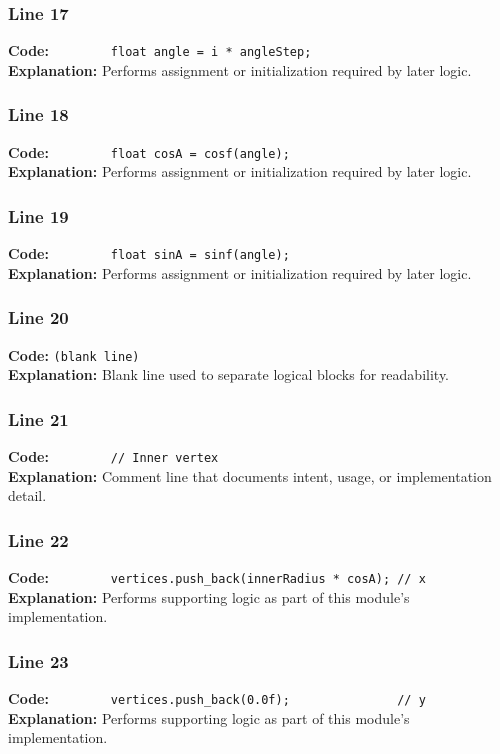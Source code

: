 \documentclass[11pt,a4paper]{article}
\begin{document}
\subsubsection*{Line 17}
\textbf{Code:} \verb|        float angle = i * angleStep;|\\
\textbf{Explanation:} Performs assignment or initialization required by later logic.

\subsubsection*{Line 18}
\textbf{Code:} \verb|        float cosA = cosf(angle);|\\
\textbf{Explanation:} Performs assignment or initialization required by later logic.

\subsubsection*{Line 19}
\textbf{Code:} \verb|        float sinA = sinf(angle);|\\
\textbf{Explanation:} Performs assignment or initialization required by later logic.

\subsubsection*{Line 20}
\textbf{Code:} \texttt{(blank line)}\\
\textbf{Explanation:} Blank line used to separate logical blocks for readability.

\subsubsection*{Line 21}
\textbf{Code:} \verb|        // Inner vertex|\\
\textbf{Explanation:} Comment line that documents intent, usage, or implementation detail.

\subsubsection*{Line 22}
\textbf{Code:} \verb|        vertices.push_back(innerRadius * cosA); // x|\\
\textbf{Explanation:} Performs supporting logic as part of this module's implementation.

\subsubsection*{Line 23}
\textbf{Code:} \verb|        vertices.push_back(0.0f);               // y|\\
\textbf{Explanation:} Performs supporting logic as part of this module's implementation.
\end{document}

